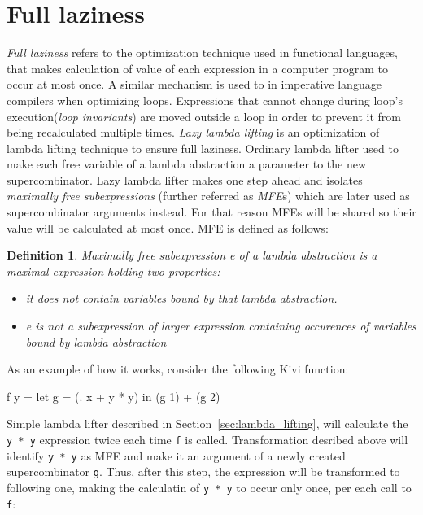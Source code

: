 \documentclass[12pt,a4paper]{report}
\newtheorem{definition}{Definition}[chapter]
\begin{document}
\section{Full laziness}
\textit{Full laziness} refers to the optimization technique used in functional
languages, that makes calculation of value of each expression in a computer
program to occur at most once. A similar mechanism is used to in imperative
language compilers when optimizing loops. Expressions that cannot change during
loop's execution(\textit{loop invariants}) are moved outside a loop in order to
prevent it from being recalculated multiple times.
\textit{Lazy lambda lifting} is an optimization of lambda lifting technique to
ensure full laziness. Ordinary lambda lifter used to make each free variable of
a lambda abstraction a parameter to the new supercombinator. Lazy lambda lifter
makes one step ahead and isolates \textit{maximally free subexpressions}
(further referred as \textit{MFE}s) which are later used as supercombinator
arguments instead. For that reason MFEs will be shared so their value will be
calculated at most once. MFE is defined as follows:

\begin{definition}
  Maximally free subexpression e of a lambda abstraction is a maximal
  expression holding two properties:

  \begin{itemize}
    \item it does not contain variables bound by that lambda abstraction.
    \item e is not a subexpression of larger expression containing occurences of
      variables bound by lambda abstraction
  \end{itemize}
\end{definition}

As an example of how it works, consider the following Kivi function:

\vspace*{0.2in}
\begin{code}[style=haskell]
  f y =
      let g = (\x . x + y * y)
      in (g 1) + (g 2)
\end{code}

Simple lambda lifter described in Section~\ref{sec:lambda_lifting}, will
calculate the \texttt{y * y} expression twice each time \texttt{f} is called.
Transformation desribed above will identify \texttt{y * y} as MFE and make it
an argument of a newly created supercombinator \texttt{g}. Thus, after this
step, the expression will be transformed to following one, making the
calculatin of \texttt{y * y} to occur only once, per each call to \texttt{f}:
\end{document}
